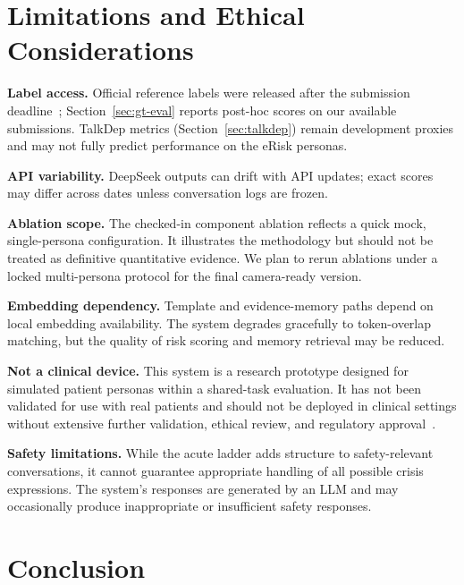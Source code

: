 \documentclass[]{ceurart}
\begin{document}
\section{Limitations and Ethical Considerations}\label{sec:limitations}

\textbf{Label access.}
Official reference labels were released after the submission deadline~\cite{PerezEtAl2026eRiskWorkingNotes}; Section~\ref{sec:gt-eval} reports post-hoc scores on our available submissions.
TalkDep metrics (Section~\ref{sec:talkdep}) remain development proxies and may not fully predict performance on the eRisk personas.

\textbf{API variability.}
DeepSeek outputs can drift with API updates; exact scores may differ across dates unless conversation logs are frozen.

\textbf{Ablation scope.}
The checked-in component ablation reflects a quick mock, single-persona configuration.
It illustrates the methodology but should not be treated as definitive quantitative evidence.
We plan to rerun ablations under a locked multi-persona protocol for the final camera-ready version.

\textbf{Embedding dependency.}
Template and evidence-memory paths depend on local embedding availability.
The system degrades gracefully to token-overlap matching, but the quality of risk scoring and memory retrieval may be reduced.

\textbf{Not a clinical device.}
This system is a research prototype designed for simulated patient personas within a shared-task evaluation.
It has not been validated for use with real patients and should not be deployed in clinical settings without extensive further validation, ethical review, and regulatory approval~\cite{Weidinger2022ethical}.

\textbf{Safety limitations.}
While the acute ladder adds structure to safety-relevant conversations, it cannot guarantee appropriate handling of all possible crisis expressions.
The system's responses are generated by an LLM and may occasionally produce inappropriate or insufficient safety responses.


\section{Conclusion}\label{sec:conclusion}
\end{document}

